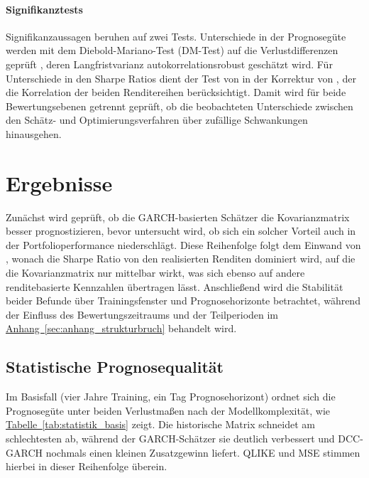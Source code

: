 \documentclass[12pt,a4paper]{article}
\begin{document}
\paragraph{Signifikanztests}
Signifikanzaussagen beruhen auf zwei Tests.
Unterschiede in der Prognosegüte werden mit dem Diebold-Mariano-Test (DM-Test) auf die Verlustdifferenzen geprüft \parencite{diebold1995,west1996}, deren Langfristvarianz autokorrelationsrobust geschätzt wird.
Für Unterschiede in den Sharpe Ratios dient der Test von \textcite{jobson1981} in der Korrektur von \textcite{memmel2003}, der die Korrelation der beiden Renditereihen berücksichtigt.
Damit wird für beide Bewertungsebenen getrennt geprüft, ob die beobachteten Unterschiede zwischen den Schätz- und Optimierungsverfahren über zufällige Schwankungen hinausgehen.

\section{Ergebnisse}\label{sec:ergebnisse}
Zunächst wird geprüft, ob die GARCH-basierten Schätzer die Kovarianzmatrix besser prognostizieren, bevor untersucht wird, ob sich ein solcher Vorteil auch in der Portfolioperformance niederschlägt.
Diese Reihenfolge folgt dem Einwand von \textcite{engle2006}, wonach die Sharpe Ratio von den realisierten Renditen dominiert wird, auf die die Kovarianzmatrix nur mittelbar wirkt, was sich ebenso auf andere renditebasierte Kennzahlen übertragen lässt.
Anschließend wird die Stabilität beider Befunde über Trainingsfenster und Prognosehorizonte betrachtet, während der Einfluss des Bewertungszeitraums und der Teilperioden im \hyperref[sec:anhang_strukturbruch]{Anhang~\ref*{sec:anhang_strukturbruch}} behandelt wird.

\subsection{Statistische Prognosequalität}\label{sec:statistisch}
Im Basisfall (vier Jahre Training, ein Tag Prognosehorizont) ordnet sich die Prognosegüte unter beiden Verlustmaßen nach der Modellkomplexität, wie \hyperref[tab:statistik_basis]{Tabelle~\ref*{tab:statistik_basis}} zeigt.
Die historische Matrix schneidet am schlechtesten ab, während der GARCH-Schätzer sie deutlich verbessert und DCC-GARCH nochmals einen kleinen Zusatzgewinn liefert.
QLIKE und MSE stimmen hierbei in dieser Reihenfolge überein.
\end{document}
